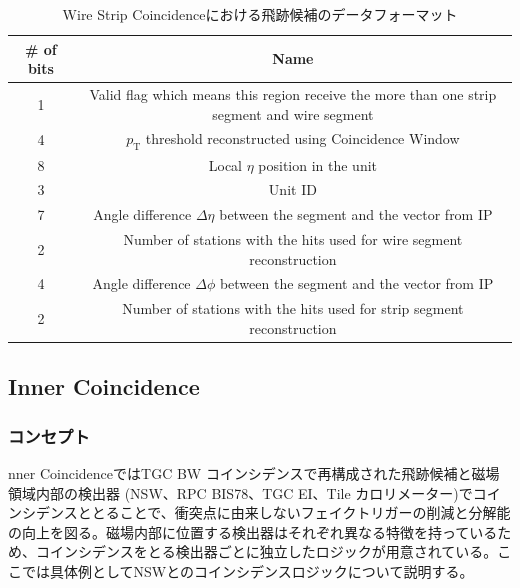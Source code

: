 \begin{table}[]
    \centering
    \caption{Wire Strip Coincidenceにおける飛跡候補のデータフォーマット}
    \label{tab:WS}
    \begin{tabular}{|c|c|}
    \hline
    \# of bits & Name                                                                                        \\ \hline\hline
    1          & Valid flag which means this region receive the more than one strip segment and wire segment \\ \hline
    4          & $p_{\mathrm{T}}$ threshold reconstructed using Coincidence Window                           \\ \hline
    8          & Local $\eta$ position in the unit                                                           \\ \hline
    3          & Unit ID                                                                                     \\ \hline
    7          & Angle difference $\Delta\eta$ between the segment and the vector from IP                    \\ \hline
    2          & Number of stations with the hits used for wire segment reconstruction                       \\ \hline
    4          & Angle difference $\Delta\phi$ between the segment and the vector from IP                    \\ \hline
    2          & Number of stations with the hits used for strip segment reconstruction                      \\ \hline
    \end{tabular}
\end{table}

\subsection{Inner Coincidence}
\subsubsection*{コンセプト}
nner CoincidenceではTGC BW コインシデンスで再構成された飛跡候補と磁場領域内部の検出器 (NSW、RPC BIS78、TGC EI、Tile カロリメーター)でコインシデンスととることで、衝突点に由来しないフェイクトリガーの削減と\pt 分解能の向上を図る。磁場内部に位置する検出器はそれぞれ異なる特徴を持っているため、コインシデンスをとる検出器ごとに独立したロジックが用意されている。ここでは具体例としてNSWとのコインシデンスロジックについて説明する。

